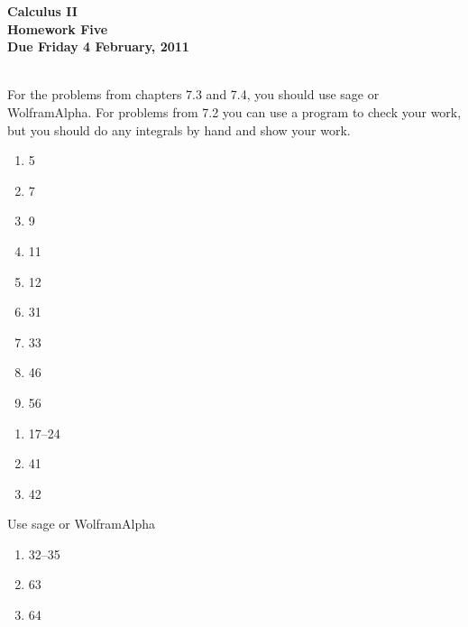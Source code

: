 \documentclass[12pt]{article}
\begin{document}
\pagestyle{empty}
 
\begin{center}
{\large {\bf Calculus II}}\\
\medskip
{\large {\bf Homework Five}}\\
\medskip
{ {\bf Due Friday 4 February, 2011}}\\
\end{center}

\hspace{2mm}\\
   
\noindent For the problems from chapters 7.3 and 7.4, you should use
sage or WolframAlpha. For problems from 7.2 you can use a program to
check your work, but you  should do any integrals by hand and show
your work.\\
\hspace{2mm}


\begin{enumerate}
\setlength{\itemsep}{-1mm}
  \item 5
  \item 7
  \item 9
  \item 11
  \item 12
  \item 31
  \item 33
  \item 46
  \item 56
\end{enumerate}


\begin{enumerate}
\setlength{\itemsep}{-1mm}
  \item 17--24
  \item 41
  \item 42
\end{enumerate}


 Use sage or WolframAlpha

\begin{enumerate}
\setlength{\itemsep}{-1mm}
  \item 32--35
  \item 63
  \item 64
\end{enumerate}
\end{document}
